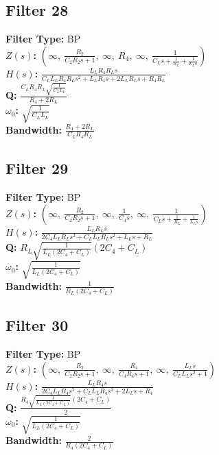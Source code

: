 \documentclass{article}
\begin{document}
\subsection*{Filter 28}
\textbf{Filter Type:} BP \\ 
\textbf{$Z(s)$:} $\left( \infty, \  \frac{R_{2}}{C_{2} R_{2} s + 1}, \  \infty, \  R_{4}, \  \infty, \  \frac{1}{C_{L} s + \frac{1}{R_{L}} + \frac{1}{L_{L} s}}\right)$ \\ 
\textbf{$H(s)$:} $\frac{L_{L} R_{4} R_{L} s}{C_{L} L_{L} R_{4} R_{L} s^{2} + L_{L} R_{4} s + 2 L_{L} R_{L} s + R_{4} R_{L}}$ \\ 
\textbf{Q:} $\frac{C_{L} R_{4} R_{L} \sqrt{\frac{1}{C_{L} L_{L}}}}{R_{4} + 2 R_{L}}$ \\ 
\textbf{$\omega_0$:} $\sqrt{\frac{1}{C_{L} L_{L}}}$ \\ 
\textbf{Bandwidth:} $\frac{R_{4} + 2 R_{L}}{C_{L} R_{4} R_{L}}$ \\ 
\subsection*{Filter 29}
\textbf{Filter Type:} BP \\ 
\textbf{$Z(s)$:} $\left( \infty, \  \frac{R_{2}}{C_{2} R_{2} s + 1}, \  \infty, \  \frac{1}{C_{4} s}, \  \infty, \  \frac{1}{C_{L} s + \frac{1}{R_{L}} + \frac{1}{L_{L} s}}\right)$ \\ 
\textbf{$H(s)$:} $\frac{L_{L} R_{L} s}{2 C_{4} L_{L} R_{L} s^{2} + C_{L} L_{L} R_{L} s^{2} + L_{L} s + R_{L}}$ \\ 
\textbf{Q:} $R_{L} \sqrt{\frac{1}{L_{L} \left(2 C_{4} + C_{L}\right)}} \left(2 C_{4} + C_{L}\right)$ \\ 
\textbf{$\omega_0$:} $\sqrt{\frac{1}{L_{L} \left(2 C_{4} + C_{L}\right)}}$ \\ 
\textbf{Bandwidth:} $\frac{1}{R_{L} \left(2 C_{4} + C_{L}\right)}$ \\ 
\subsection*{Filter 30}
\textbf{Filter Type:} BP \\ 
\textbf{$Z(s)$:} $\left( \infty, \  \frac{R_{2}}{C_{2} R_{2} s + 1}, \  \infty, \  \frac{R_{4}}{C_{4} R_{4} s + 1}, \  \infty, \  \frac{L_{L} s}{C_{L} L_{L} s^{2} + 1}\right)$ \\ 
\textbf{$H(s)$:} $\frac{L_{L} R_{4} s}{2 C_{4} L_{L} R_{4} s^{2} + C_{L} L_{L} R_{4} s^{2} + 2 L_{L} s + R_{4}}$ \\ 
\textbf{Q:} $\frac{R_{4} \sqrt{\frac{1}{L_{L} \left(2 C_{4} + C_{L}\right)}} \left(2 C_{4} + C_{L}\right)}{2}$ \\ 
\textbf{$\omega_0$:} $\sqrt{\frac{1}{L_{L} \left(2 C_{4} + C_{L}\right)}}$ \\ 
\textbf{Bandwidth:} $\frac{2}{R_{4} \left(2 C_{4} + C_{L}\right)}$ \\ 
\end{document}
